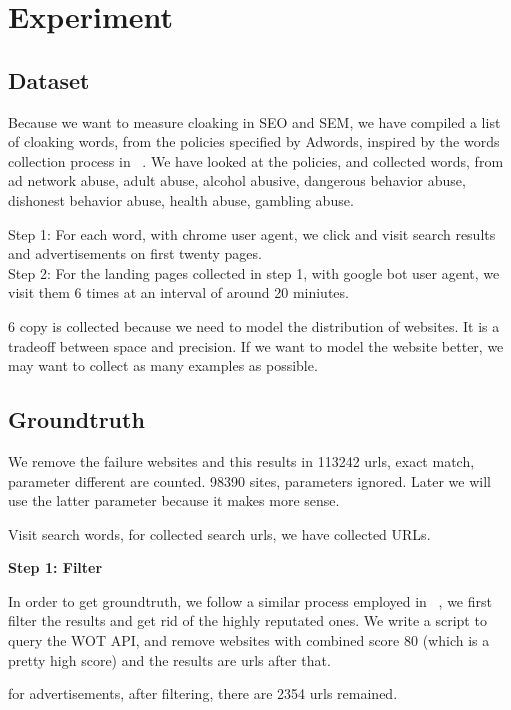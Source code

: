 \section{Experiment}
\label{s:experiment}

\subsection{Dataset}


Because we want to measure cloaking in SEO and SEM, we have compiled a list of
cloaking words, from the policies specified by Adwords, inspired by the words
collection process in ~\cite{wang2011cloak}. We have looked at the policies, and
collected  words, from ad network abuse, adult abuse, alcohol abusive, dangerous behavior
abuse, dishonest behavior abuse, health abuse, gambling abuse.

Step 1: For each word, with chrome user agent, we click and visit search results and advertisements on first
twenty pages. \\
Step 2: For the landing pages collected in step 1, with google bot user agent, we visit them 6 times at an
interval of around 20 miniutes.

6 copy is collected because we need to model the distribution of websites. It is
a tradeoff between space and precision. If we want to model the website better,
we may want to collect as many examples as possible.


\subsection{Groundtruth}

We remove the failure websites and this results in 
113242 urls, exact match, parameter different are counted.
98390 sites, parameters ignored. Later we will use the latter parameter because
it makes more sense.


Visit  search words, for collected search urls, we have collected
 URLs.


\bf{Step 1: Filter}

In order to get groundtruth, we follow a similar process employed in
~\cite{lin2009detection}, we first filter the results and get rid of the highly reputated ones. We write a
script to query the WOT API, and remove websites with combined score 80
(which is a pretty high score) and the results are  urls after that.

for advertisements, after filtering, there are 2354 urls
remained.

